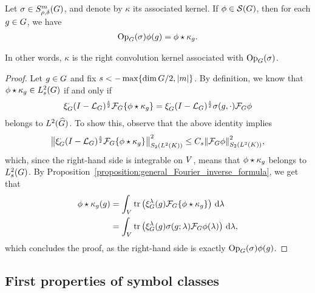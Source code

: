 \begin{proposition}[Quantisation]
\label{proposition:quantisation}
    Let $\sigma \in \SymbolClass{m}{\rho, \delta}$,
    and denote by $\kappa$ its associated kernel.
    If $\phi \in \Schwartz\Group$, then for each $g \in \Group$, we have
    \begin{align*}
        \Op(\sigma) \phi(g) = \conv{\phi}{\kappa_g}.
    \end{align*}

    In other words, $\kappa$ is the right convolution kernel associated with $\Op(\sigma)$.
\end{proposition}
\begin{proof}
    Let $g \in \Group$ and fix $s < -\max \{\dim \Group/2, \abs m\}$.
    By definition, we know that $\conv \phi \kappa_g \in \Sobolev s$ if and only if
    \begin{align*}
        \Rep \dummy \BesselPotential s \Fourier \{\conv \phi {\kappa_g}\}
        = \Rep \dummy \BesselPotential s \sigma(g, \dummy) \Fourier \phi
    \end{align*}
    belongs to $\LebesgueDual 2 \Group$.
    To show this,
    observe that the above identity implies
    \begin{align*}
        \norm[\SchattenClasses 2 {\Lebesgue 2 \CompactGroup}] {\Rep \dummy \BesselPotential s \Fourier \{\conv \phi {\kappa_g}\}}^2
        \leq C_s \norm[\SchattenClasses 2 {\Lebesgue 2 \CompactGroup}] {\Fourier \phi}^2,
    \end{align*}
    which, since the right-hand side is integrable on $\VectorSpace$,
    means that $\conv \phi {\kappa_g}$ belongs to $\Sobolev s$.
    By Proposition~\ref{proposition:general_Fourier_inverse_formula},
    we get that
    \begin{align*}
        \conv \phi {\kappa_g}(g)
        &= \int_\VectorSpace \tr\left(\Rep \lambda(g) \Fourier \{\conv \phi {\kappa_g}\}\right) \dd \lambda\\
        &= \int_\VectorSpace \tr\left(\Rep \lambda(g) \sigma(g; \lambda) \Fourier \phi(\lambda)\right) \dd \lambda,
    \end{align*}
    which concludes the proof,
    as the right-hand side is exactly $\Op(\sigma) \phi(g)$.
\end{proof}

\subsection{First properties of symbol classes}

